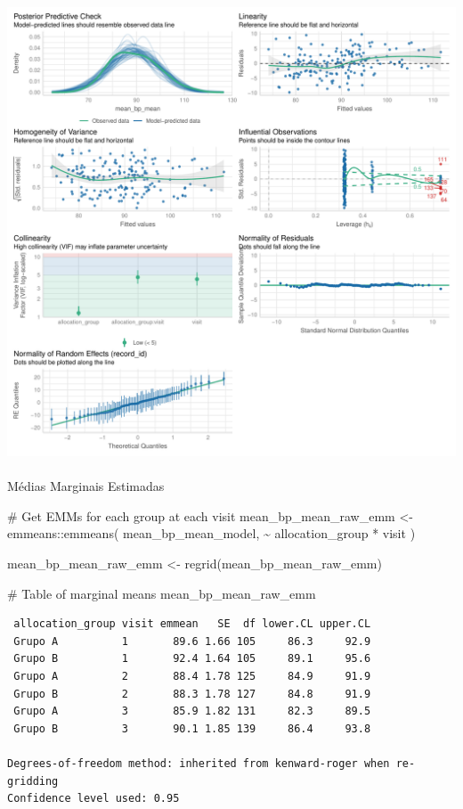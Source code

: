\documentclass[
  letterpaper,
  DIV=11,
  numbers=noendperiod]{scrartcl}
\makeatletter
\let\oldparagraph\paragraph
\renewcommand{\paragraph}{
    \@ifstar
      \xxxParagraphStar
      \xxxParagraphNoStar
  }
\newcommand{\xxxParagraphStar}[1]{\oldparagraph*{#1}\mbox{}}
\newcommand{\xxxParagraphNoStar}[1]{\oldparagraph{#1}\mbox{}}
\newenvironment{Shaded}{\begin{snugshade}}{\end{snugshade}}
\newcommand{\CommentTok}[1]{\textcolor[rgb]{0.37,0.37,0.37}{#1}}
\newcommand{\FunctionTok}[1]{\textcolor[rgb]{0.28,0.35,0.67}{#1}}
\newcommand{\NormalTok}[1]{\textcolor[rgb]{0.00,0.23,0.31}{#1}}
\newcommand{\OtherTok}[1]{\textcolor[rgb]{0.00,0.23,0.31}{#1}}
\newcommand{\SpecialCharTok}[1]{\textcolor[rgb]{0.37,0.37,0.37}{#1}}
\makeatother
\begin{document}
\includegraphics{Outcomes_V1V2V3_files/figure-pdf/mean_bp_mean_4-2.pdf}

\paragraph{Médias Marginais
Estimadas}\label{muxe9dias-marginais-estimadas-15}

\begin{Shaded}
\begin{Highlighting}[]
\CommentTok{\# Get EMMs for each group at each visit}
\NormalTok{mean\_bp\_mean\_raw\_emm }\OtherTok{\textless{}{-}}\NormalTok{ emmeans}\SpecialCharTok{::}\FunctionTok{emmeans}\NormalTok{(}
\NormalTok{    mean\_bp\_mean\_model, }
    \SpecialCharTok{\textasciitilde{}}\NormalTok{ allocation\_group }\SpecialCharTok{*}\NormalTok{ visit}
\NormalTok{)}

\NormalTok{mean\_bp\_mean\_raw\_emm }\OtherTok{\textless{}{-}} \FunctionTok{regrid}\NormalTok{(mean\_bp\_mean\_raw\_emm)}

\CommentTok{\# Table of marginal means}
\NormalTok{mean\_bp\_mean\_raw\_emm}
\end{Highlighting}
\end{Shaded}

\begin{verbatim}
 allocation_group visit emmean   SE  df lower.CL upper.CL
 Grupo A          1       89.6 1.66 105     86.3     92.9
 Grupo B          1       92.4 1.64 105     89.1     95.6
 Grupo A          2       88.4 1.78 125     84.9     91.9
 Grupo B          2       88.3 1.78 127     84.8     91.9
 Grupo A          3       85.9 1.82 131     82.3     89.5
 Grupo B          3       90.1 1.85 139     86.4     93.8

Degrees-of-freedom method: inherited from kenward-roger when re-gridding 
Confidence level used: 0.95 
\end{verbatim}
\end{document}
